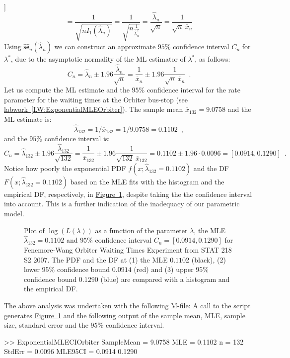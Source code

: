 {\begin{example}[[Fisher Information of the $\exponential$ Experiment]]
\[= \frac{1}{\sqrt{n I_1(\widehat{\lambda}_n)}} 
= \frac{1}{\sqrt{n \frac{1}{\widehat{\lambda}_n^2} }}
= \frac{\widehat{\lambda}_n}{\sqrt{n}}
= \frac{1}{\sqrt{n} \ \overline{x}_n}
\]
Using $\widehat{\mathsf{se}}_n(\widehat{\lambda}_n)$ we can construct an approximate $95\%$ confidence interval $C_n$ for $\lambda^*$, due to the asymptotic normality of the ML estimator of $\lambda^*$, as follows:
\[
C_n 
= \widehat{\lambda}_n \pm 1.96 \frac{\widehat{\lambda}_n}{\sqrt{n}}
= \frac{1}{\overline{x}_n} \pm 1.96 \frac{1}{\sqrt{n} \ \overline{x}_n} \enspace .
\]
Let us compute the ML estimate and the $95\%$ confidence interval for the rate parameter for the waiting times at the Orbiter bus-stop (see \hyperref[LW:ExponentialMLEOrbiter]{labwork~\ref*{LW:ExponentialMLEOrbiter}}).  The sample mean $\overline{x}_{132}=9.0758$ and the ML estimate is:
$$\widehat{\lambda}_{132}=1/\overline{x}_{132}=1/9.0758=0.1102 \enspace ,$$
and the $95\%$ confidence interval is:  
\[
C_n 
= \widehat{\lambda}_{132} \pm 1.96 \frac{\widehat{\lambda}_{132}}{\sqrt{132}}
= \frac{1}{\overline{x}_{132}} \pm 1.96 \frac{1}{\sqrt{132} \ \overline{x}_{132}} = 0.1102 \pm 1.96 \cdot 0.0096 = [0.0914, 0.1290] \enspace .
\]
Notice how poorly the exponential PDF $f(x;\widehat{\lambda}_{132}=0.1102)$ and the DF $F(x;\widehat{\lambda}_{132}=0.1102)$ based on the MLE fits with the histogram and the empirical DF, respectively, in \hyperref[F:ExponentialMLECIOrbiter]{Figure~\ref*{F:ExponentialMLECIOrbiter}}, despite  taking the the confidence interval into account.  This is a further indication of the inadequacy of our parametric model.
\end{example}

\begin{figure}[htpb]
\caption{Plot of $\log(L(\lambda))$ as a function of the parameter $\lambda$, the MLE 
$\widehat{\lambda}_{132}=0.1102$ and $95\%$ confidence interval $C_n=[0.0914, 0.1290]$ for Fenemore-Wang Orbiter Waiting Times Experiment from STAT 218 S2 2007.  The PDF and the DF at (1) the MLE $0.1102$ (black), (2) lower $95\%$ confidence bound $0.0914$ (red) and (3) upper $95\%$ confidence bound $0.1290$ (blue) are compared with a histogram and the empirical DF.
\label{F:ExponentialMLECIOrbiter}}
\centering   {}
\end{figure}

\begin{labwork}\label{LW:ExponentialMLECIOrbiter}
The above analysis was undertaken with the following M-file:
A call to the script generates \hyperref[F:ExponentialMLECIOrbiter]{Figure~\ref*{F:ExponentialMLECIOrbiter}} and the following output of the sample mean, MLE, sample size, standard error and the $95\%$ confidence interval.  
\begin{VrbM}
>> ExponentialMLECIOrbiter
SampleMean =    9.0758
MLE =    0.1102
n =   132
StdErr =    0.0096
MLE95CI =    0.0914    0.1290
\end{VrbM}
\end{labwork}

}
